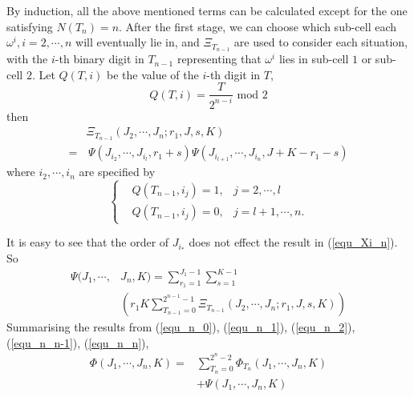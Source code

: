 \documentclass[Afour,sageh,times]{sagej}
\begin{document}
By induction, all the above mentioned terms can be calculated except for the one satisfying $N(T_n) = n$. %
After the first stage, we can choose which sub-cell each $\omega^i, i = 2, \cdots, n$ will eventually lie in, and $\Xi_{T_{n-1}}$ are used to consider each situation, with the $i$-th binary digit in $T_{n-1}$ representing that $\omega^i$ lies in sub-cell $1$ or sub-cell $2$. %
Let $Q(T, i)$ be the value of the $i$-th digit in $T$,  
\begin{equation}
Q(T, i) = \frac{T}{2^{n-i}}\mbox{ mod } 2
\end{equation}
then
\begin{equation}\label{equ_Xi_n}
\begin{aligned}
&\Xi_{T_{n-1}}(J_2, \cdots, J_n; r_1, J, s, K) \\
=&\, \Psi(J_{i_2}, \cdots, J_{i_l}, r_1+s)\Psi(J_{i_{l+1}}, \cdots, J_{i_n}, J+K-r_1-s)
\end{aligned}
\end{equation}
where $i_2, \cdots, i_n$ are specified by
\begin{equation}
\left\{
\begin{aligned}
&Q(T_{n-1}, i_j) = 1, &j = 2, \cdots, l\\
&Q(T_{n-1}, i_j) = 0, &j = l+1, \cdots, n.
\end{aligned}
\right.
\end{equation}

It is easy to see that the order of $J_{i_*}$ does not effect the result in (\ref{equ_Xi_n}). So
\begin{equation}\label{equ_n_n}
\begin{aligned}
\Psi(J_1, \cdots, &J_n, K) = \sum\limits_{r_1 = 1}^{J_1 - 1} \sum\limits_{s = 1}^{K-1}\\
&\left(r_1K \sum\limits_{T_{n-1} = 0	}^{2^{n-1}-1}\Xi_{T_{n-1}}(J_2, \cdots, J_n; r_1, J, s, K) \right)
\end{aligned}
\end{equation}
Summarising the results from (\ref{equ_n_0}), (\ref{equ_n_1}), (\ref{equ_n_2}), (\ref{equ_n_n-1}), (\ref{equ_n_n}), 
\begin{equation}
\begin{aligned}
\Phi(J_1, \cdots, J_n, K) = &\sum\limits_{T_n = 0}^{2^n-2}\Phi_{T_n}(J_1, \cdots, J_n, K)\\
& + \Psi(J_1, \cdots, J_n, K)
\end{aligned}
\end{equation}
\end{document}

